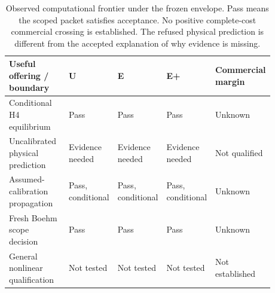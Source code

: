\begin{table}[H]\centering\small
\begin{tabular}{@{}p{0.29\linewidth}p{0.145\linewidth}p{0.145\linewidth}p{0.145\linewidth}p{0.15\linewidth}@{}}\toprule
Useful offering / boundary & U & E & E+ & Commercial margin \\ \midrule
Conditional H4 equilibrium & Pass & Pass & Pass & Unknown \\
Uncalibrated physical prediction & Evidence needed & Evidence needed & Evidence needed & Not qualified \\
Assumed-calibration propagation & Pass, conditional & Pass, conditional & Pass, conditional & Unknown \\
Fresh Boehm scope decision & Pass & Pass & Pass & Unknown \\
General nonlinear qualification & Not tested & Not tested & Not tested & Not established \\
\bottomrule\end{tabular}
\caption{Observed computational frontier under the frozen envelope. Pass means the scoped packet satisfies acceptance. No positive complete-cost commercial crossing is established. The refused physical prediction is different from the accepted explanation of why evidence is missing.}
\end{table}
